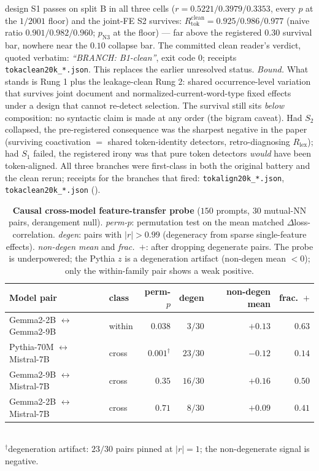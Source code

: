 design S1 passes on split B in all three cells ($r{=}0.5221/0.3979/0.3353$, every $p$ at
the $1/2001$ floor) and the joint-FE S2 survives:
$R_{\text{tok}}^{\text{clean}}{=}0.925/0.986/0.977$ (naive ratio $0.901/0.982/0.960$;
$p_{\text{N3}}$ at the floor) --- far above the registered $0.30$ survival bar, nowhere
near the $0.10$ collapse bar. The committed clean reader's verdict, quoted verbatim:
\emph{``BRANCH: B1-clean''}, exit code $0$; receipts \texttt{tokaclean20k\_*.json}. This
replaces the earlier unresolved status.
\emph{Bound.} What stands is Rung 1 plus the leakage-clean Rung 2: shared
occurrence-level variation that survives joint document and normalized-current-word-type
fixed effects under a design that cannot re-detect selection. The survival
still sits \emph{below} composition: no syntactic claim is made at any order (the bigram
caveat). Had $S_2$ collapsed, the
pre-registered consequence was the sharpest negative in the paper (surviving coactivation
$=$ shared token-identity detectors, retro-diagnosing $R_{\text{lex}}$); had $S_1$ failed,
the registered irony was that pure token detectors \emph{would} have been token-aligned. All
three branches were first-class in both the original battery and the clean rerun; receipts
for the branches that fired: \texttt{tokalign20k\_*.json}, \texttt{tokaclean20k\_*.json}
().



\begin{table}[h]
\centering
\caption{\textbf{Causal cross-model feature-transfer probe} ($150$ prompts, $30$ mutual-NN
pairs, derangement null). \emph{perm-$p$}: permutation test on the mean matched
$\Delta$loss-correlation. \emph{degen}: pairs with $|r|>0.99$ (degeneracy from sparse
single-feature effects). \emph{non-degen mean} and \emph{frac.\ $+$}: after dropping degenerate
pairs. The probe is underpowered; the Pythia $z$ is a degeneration artifact (non-degen mean
$<0$); only the within-family pair shows a weak positive.}
\label{tab:causal}
\small
\begin{tabular}{llrrrr}
\toprule
Model pair & class & perm-$p$ & degen & non-degen mean & frac.\ $+$ \\
\midrule
Gemma2-2B $\leftrightarrow$ Gemma2-9B & within & $0.038$ & $3/30$ & $+0.13$ & $0.63$ \\
Pythia-70M $\leftrightarrow$ Mistral-7B & cross & $0.001^{\dagger}$ & $23/30$ & $-0.12$ & $0.14$ \\
Gemma2-9B $\leftrightarrow$ Mistral-7B & cross & $0.35$ & $16/30$ & $+0.16$ & $0.50$ \\
Gemma2-2B $\leftrightarrow$ Mistral-7B & cross & $0.71$ & $8/30$ & $+0.09$ & $0.41$ \\
\bottomrule
\end{tabular}
\\[2pt]
{\footnotesize $^{\dagger}$degeneration artifact: $23/30$ pairs pinned at $|r|=1$; the
non-degenerate signal is negative.}
\end{table}

